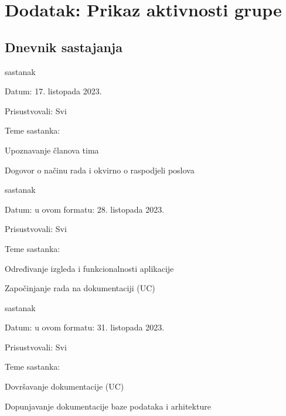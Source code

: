 \chapter*{Dodatak: Prikaz aktivnosti grupe}
		
		\section*{Dnevnik sastajanja}
		
		\begin{packed_enum}
			\item  sastanak
			
			\item[] \begin{packed_item}
				\item Datum: 17. listopada 2023.
				\item Prisustvovali: Svi
				\item Teme sastanka:
				\begin{packed_item}
					\item  Upoznavanje članova tima
					\item  Dogovor o načinu rada i okvirno o raspodjeli poslova
				\end{packed_item}
			\end{packed_item}
			
			\item  sastanak
			\item[] \begin{packed_item}
				\item Datum: u ovom formatu: 28. listopada 2023.
				\item Prisustvovali: Svi
				\item Teme sastanka:
				\begin{packed_item}
					\item  Određivanje izgleda i funkcionalnosti aplikacije
					\item  Započinjanje rada na dokumentaciji (UC)
				\end{packed_item}
			\end{packed_item}

			\item  sastanak
			\item[] \begin{packed_item}
				\item Datum: u ovom formatu: 31. listopada 2023.
				\item Prisustvovali: Svi
				\item Teme sastanka:
				\begin{packed_item}
					\item  Dovršavanje dokumentacije (UC)
					\item  Dopunjavanje dokumentacije baze podataka i arhitekture
				\end{packed_item}
			\end{packed_item}
			

\end{packed_enum}

